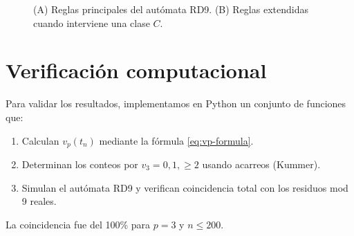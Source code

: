 \documentclass[12pt]{article}
\begin{document}
\begin{figure}[htbp]
{%
}

\vspace{0.6em}

\caption{(A) Reglas principales del autómata RD9. (B) Reglas extendidas cuando interviene una clase $C$.}
\label{fig:reglas-rd9-panel}
\end{figure}

\section{Verificación computacional}

Para validar los resultados, implementamos en Python un conjunto de funciones que:
\begin{enumerate}
    \item Calculan $v_p(t_n)$ mediante la fórmula \eqref{eq:vp-formula}.
    \item Determinan los conteos por $v_3=0,1,\ge 2$ usando acarreos (Kummer).
    \item Simulan el autómata RD9 y verifican coincidencia total con los residuos mod 9 reales.
\end{enumerate}
La coincidencia fue del 100\% para $p=3$ y $n \le 200$.

\end{document}
